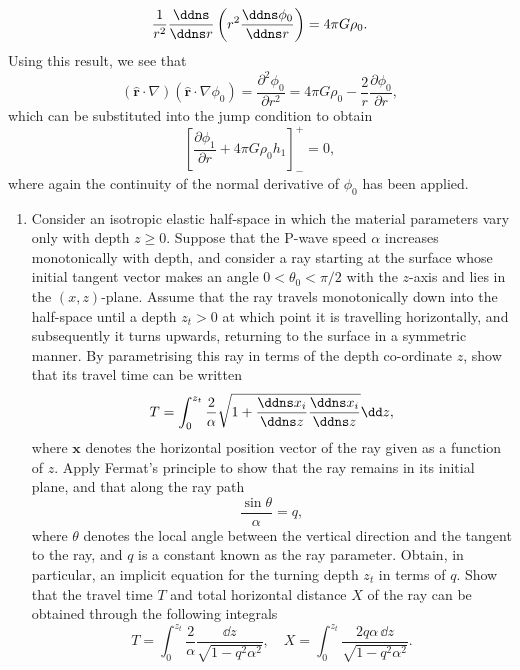 \begin{enumerate}
\begin{equation*}
    \frac{1}{r^{2}}\frac{\ddns}{\ddns r}\left(r^{2}\frac{\ddns\phi_{0}}{\ddns r}\right)=4\pi G\rho_{0}.
\end{equation*}
Using this result, we see that
\begin{equation*}
    (\hat{\mathbf{r}}\cdot\nabla)(\hat{\mathbf{r}}\cdot\nabla\phi_{0}) = \frac{\partial^{2}\phi_{0}}{\partial r^{2}}=4\pi G\rho_{0}-\frac{2}{r}\frac{\partial\phi_{0}}{\partial r},
\end{equation*}
which can be substituted into the jump condition to obtain
\begin{equation*}
    \left[\frac{\partial\phi_{1}}{\partial r}+4\pi G\rho_{0}h_{1}\right]_{-}^{+}=0,
\end{equation*}
where again the continuity of the normal derivative of $\phi_{0}$ has been applied.




\end{enumerate}

\begin{enumerate}
\item Consider an isotropic elastic half-space in which the material parameters vary only with depth $z\ge0$. Suppose that the P-wave speed $\alpha$ increases monotonically with depth, and consider a ray starting at the surface whose initial tangent vector makes an angle $0<\theta_{0}<\pi/2$ with the $z$-axis and lies in the $(x,z)$-plane. Assume that the ray travels monotonically down into the half-space until a depth $z_{t}>0$ at which point it is travelling horizontally, and subsequently it turns upwards, returning to the surface in a symmetric manner. By parametrising this ray in terms of the depth co-ordinate $z$, show that its travel time can be written
\begin{equation*}
    T=\int_{0}^{z_{t}}\frac{2}{\alpha}\sqrt{1+\frac{\ddns x_{i}}{\ddns z}\frac{\ddns x_{i}}{\ddns z}}\dd z,
\end{equation*}
where $\mathbf{x}$ denotes the horizontal position vector of the ray given as a function of $z$. Apply Fermat's principle to show that the ray remains in its initial plane, and that along the ray path
\begin{equation*}
    \frac{\sin\theta}{\alpha}=q,
\end{equation*}
where $\theta$ denotes the local angle between the vertical direction and the tangent to the ray, and $q$ is a constant known as the ray parameter. Obtain, in particular, an implicit equation for the turning depth $z_{t}$ in terms of $q$.
Show that the travel time $T$ and total horizontal distance $X$ of the ray can be obtained through the following integrals
\begin{equation*}
    T=\int_{0}^{z_{t}}\frac{2}{\alpha}\frac{\dd z}{\sqrt{1-q^{2}\alpha^{2}}},\quad X=\int_{0}^{z_{t}}\frac{2q\alpha\,\dd z}{\sqrt{1-q^{2}\alpha^{2}}}.
\end{equation*}

\end{enumerate}

